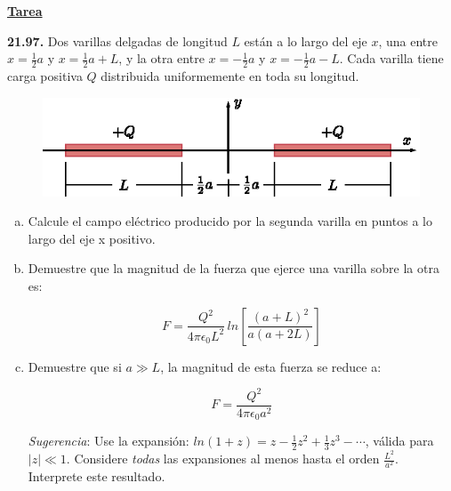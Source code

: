 \documentclass[letter,11pt]{article}
\begin{document}
\begin{center}
    {\Large \bf{\underline{Tarea}}}
\end{center}
\vspace{0.5cm}

\textbf{21.97.}
Dos varillas delgadas de longitud $L$ están a lo largo del eje $x$, una entre
$x=\frac{1}{2}a$ y $x=\frac{1}{2}a+L$, y la otra entre
$x=-\frac{1}{2}a$ y $x=-\frac{1}{2}a-L$. Cada varilla tiene carga positiva
$Q$ distribuida uniformemente en toda su longitud.

\begin{figure}[!h]
\centering
\includegraphics[scale=1.50]{resources/f1.eps}
\end{figure}

\begin{enumerate}[a)]
\item Calcule el campo eléctrico producido por la segunda varilla en
puntos a lo largo del eje x positivo.

\item Demuestre que la magnitud de la fuerza que ejerce una varilla sobre
la otra es:

\begin{equation*}
    F = \frac{Q^2}{4\pi\epsilon_0 L^2}\,ln\left[\frac{(a+L)^2}{a(a+2L)}\right]
\end{equation*}
\vspace{0.20cm}

\item Demuestre que si $a \gg L$, la magnitud de esta fuerza se reduce a:

\begin{equation*}
    F = \frac{Q^2}{4\pi\epsilon_0 a^2}
\end{equation*}
\vspace{0.20cm}

\emph{Sugerencia}: Use la expansión:
$ln(1+z)=z-\frac{1}{2}z^2+\frac{1}{3}z^3-\cdots$, válida para $|z|\ll 1$.
Considere \emph{todas} las expansiones al menos hasta el orden
$\frac{L^2}{a^2}$. Interprete este resultado.
\end{enumerate}
\vspace{0.75cm}
\end{document}
